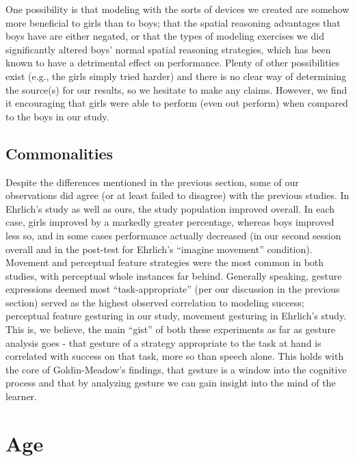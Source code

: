 One possibility is that modeling with the sorts of devices we created are
somehow more beneficial to girls than to boys; that the spatial reasoning
advantages that boys have are either negated, or that the types of modeling
exercises we did significantly altered boys' normal spatial reasoning
strategies, which has been known to have a detrimental effect on
performance\cite{beilock2002paying}\cite{lutz2001procedural}. Plenty of other
possibilities exist (e.g., the girls simply tried harder) and there is no clear
way of determining the source(s) for our results, so we hesitate to make any
claims. However, we find it encouraging that girls were able to perform (even
out perform) when compared to the boys in our study.

\subsection{Commonalities}

Despite the differences mentioned in the previous section, some of our
observations did agree (or at least failed to disagree) with the previous
studies. In Ehrlich's study as well as ours, the study population improved
overall. In each case, girls improved by a markedly greater percentage, whereas
boys improved less so, and in some cases performance actually decreased (in our
second session overall and in the post-test for Ehrlich's ``imagine movement''
condition). Movement and perceptual feature strategies were the most common in
both studies, with perceptual whole instances far behind. Generally speaking,
gesture expressions deemed most ``task-appropriate'' (per our discussion in the
previous section) served as the highest observed correlation to modeling
success; perceptual feature gesturing in our study, movement gesturing in
Ehrlich's study. This is, we believe, the main ``gist'' of both these
experiments as far as gesture analysis goes - that gesture of a strategy
appropriate to the task at hand is correlated with success on that task, more so
than speech alone. This holds with the core of Goldin-Meadow's findings, that
gesture is a window into the cognitive process and that by analyzing gesture we
can gain insight into the mind of the learner.


% 


\section{Age}

